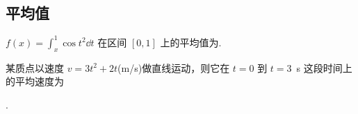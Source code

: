 \subsection{平均值}

	\begin{ti}
		$f(x) = \int_{x}^{1} \cos t^{2} \dd{t}$ 在区间 $[0,1]$ 上的平均值为\htwo.
	\end{ti}

	\begin{ti}
		某质点以速度 $v = 3t^{2} + 2t$(\si{m/s})做直线运动，则它在 $t = 0$ 到 $t = $\SI{3}{s} 这段时间上的平均速度为\htwo
		
		\noindent\htwo.
	\end{ti}